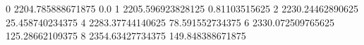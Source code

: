 0 2204.785888671875 0.0
1 2205.596923828125 0.81103515625
2 2230.24462890625 25.458740234375
4 2283.37744140625 78.591552734375
6 2330.072509765625 125.28662109375
8 2354.63427734375 149.848388671875
